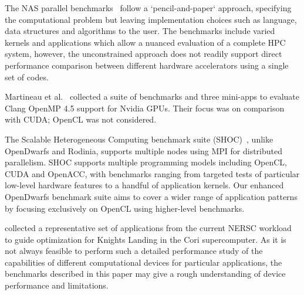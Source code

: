 \documentclass[../document.tex]{subfiles}
\begin{document}
\label{sec:related_work}
	
The NAS parallel benchmarks~\cite{bailey1991parallel} follow a `pencil-and-paper` approach, specifying the computational problem but leaving implementation choices such as language, data structures and algorithms to the user.
The benchmarks include varied kernels and applications which allow a nuanced evaluation of a complete HPC system, however, the unconstrained approach does not readily support direct performance comparison between different hardware accelerators using a single set of codes.

Martineau et al.~\cite{martineau2016performance} collected a suite of benchmarks and three mini-apps to evaluate Clang OpenMP 4.5 support for Nvidia GPUs.
Their focus was on comparison with CUDA; OpenCL was not considered.

The Scalable Heterogeneous Computing benchmark suite (SHOC)~\cite{lopez2015examining}, unlike OpenDwarfs and Rodinia, supports multiple nodes using MPI for distributed parallelism.
SHOC supports multiple programming models including OpenCL, CUDA and OpenACC, with benchmarks ranging from targeted tests of particular low-level hardware features to a handful of application kernels.
Our enhanced OpenDwarfs benchmark suite aims to cover a wider range of application patterns by focusing exclusively on OpenCL using higher-level benchmarks.

\citet{barnes2016evaluating} collected a representative set of applications from the current NERSC workload to guide optimization for Knights Landing in the Cori supercomputer.
As it is not always feasible to perform such a detailed performance study of the capabilities of different computational devices for particular applications, the benchmarks described in this paper may give a rough understanding of device performance and limitations.
\end{document}
